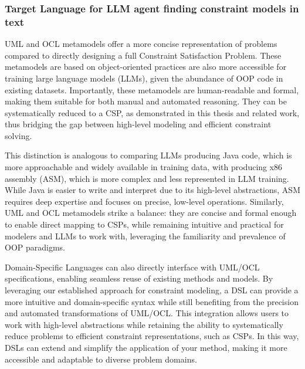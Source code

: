 \subsubsection*{Target Language for LLM agent finding constraint models in text}

UML and OCL metamodels offer a more concise representation of problems compared to directly designing a full Constraint Satisfaction Problem. These metamodels are based on object-oriented practices are also more accessible for training large language models (LLMs), given the abundance of OOP code in existing datasets. Importantly, these metamodels are human-readable and formal, making them suitable for both manual and automated reasoning. They can be systematically reduced to a CSP, as demonstrated in this thesis and related work, thus bridging the gap between high-level modeling and efficient constraint solving.

This distinction is analogous to comparing LLMs producing Java code, which is more approachable and widely available in training data, with producing x86 assembly (ASM), which is more complex and less represented in LLM training. While Java is easier to write and interpret due to its high-level abstractions, ASM requires deep expertise and focuses on precise, low-level operations. Similarly, UML and OCL metamodels strike a balance: they are concise and formal enough to enable direct mapping to CSPs, while remaining intuitive and practical for modelers and LLMs to work with, leveraging the familiarity and prevalence of OOP paradigms.

Domain-Specific Languages can also directly interface with UML/OCL specifications, enabling seamless reuse of existing methods and models. By leveraging our established approach for constraint modeling, a DSL can provide a more intuitive and domain-specific syntax while still benefiting from the precision and automated transformations of UML/OCL. This integration allows users to work with high-level abstractions while retaining the ability to systematically reduce problems to efficient constraint representations, such as CSPs. In this way, DSLs can extend and simplify the application of your method, making it more accessible and adaptable to diverse problem domains.








